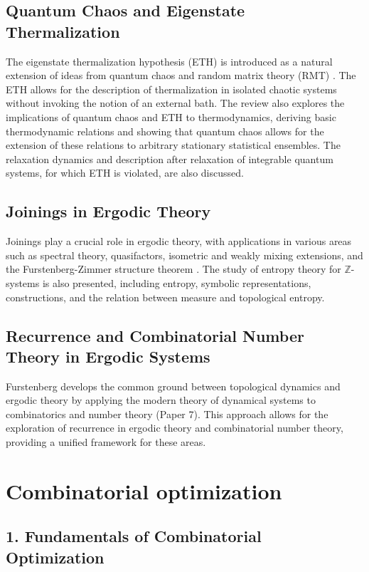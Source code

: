 \documentclass{article}
\begin{document}
\subsection{Quantum Chaos and Eigenstate Thermalization}

The eigenstate thermalization hypothesis (ETH) is introduced as a natural extension of ideas from quantum chaos and random matrix theory (RMT) \cite{D'Alessio2015FromQC}. The ETH allows for the description of thermalization in isolated chaotic systems without invoking the notion of an external bath. The review also explores the implications of quantum chaos and ETH to thermodynamics, deriving basic thermodynamic relations and showing that quantum chaos allows for the extension of these relations to arbitrary stationary statistical ensembles. The relaxation dynamics and description after relaxation of integrable quantum systems, for which ETH is violated, are also discussed.

\subsection{Joinings in Ergodic Theory}

Joinings play a crucial role in ergodic theory, with applications in various areas such as spectral theory, quasifactors, isometric and weakly mixing extensions, and the Furstenberg-Zimmer structure theorem \cite{Glasner2003ErgodicTV}. The study of entropy theory for $\mathbb{Z}$-systems is also presented, including entropy, symbolic representations, constructions, and the relation between measure and topological entropy.

\subsection{Recurrence and Combinatorial Number Theory in Ergodic Systems}

Furstenberg develops the common ground between topological dynamics and ergodic theory by applying the modern theory of dynamical systems to combinatorics and number theory (Paper 7). This approach allows for the exploration of recurrence in ergodic theory and combinatorial number theory, providing a unified framework for these areas.


\section{Combinatorial optimization}

\subsection{1. Fundamentals of Combinatorial Optimization}
\end{document}
